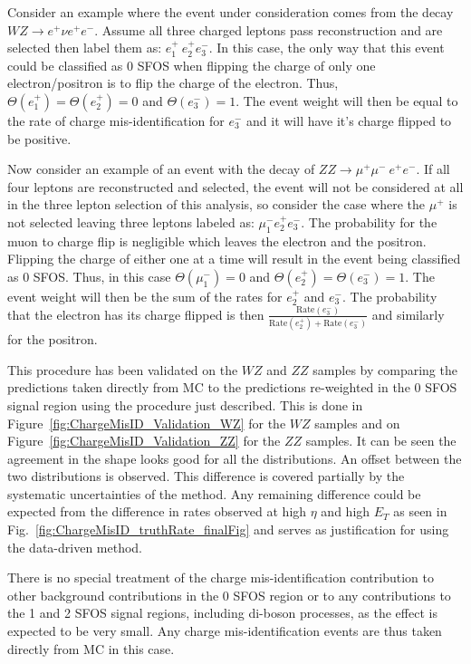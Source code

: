 Consider an example 
where the event under consideration comes from the decay $WZ\rightarrow e^{+}\nu e^{+}e^{-}$. Assume all three charged leptons pass reconstruction and are selected then label them as: $e^{+}_1~e^{+}_2e^{-}_3$. In this case,
the only way that this event could be classified as 0 SFOS when flipping the charge of only one electron/positron is to flip the charge of the electron.
Thus, $\Theta(e^{+}_1)=\Theta(e^{+}_2)=0$ and $\Theta(e^{-}_3)=1$.  The event weight will then be equal to the rate of charge mis-identification for  $e^{-}_3$ and it
will have it's charge flipped to be positive.

Now consider an example of an event with the decay of $ZZ\rightarrow \mu^{+}\mu^{-}~ e^{+}e^{-}$.
If all four leptons are reconstructed and selected, the event will not be considered at all in the three lepton selection of this analysis, so consider the 
case where the $\mu^{+}$ is not selected leaving three leptons labeled as: $\mu^{-}_1 e^{+}_2 e^{-}_3$.  The probability for the muon to charge flip
is negligible which leaves the electron and the positron. Flipping the charge of either one at a time will result in the event being classified as 0 SFOS.  Thus, in
this case $\Theta(\mu^{-}_1)=0$ and $\Theta(e^{+}_2)=\Theta(e^{-}_3)=1$. The event weight will then be the sum of the rates for $e^{+}_2$ and $e^{-}_3$.
The probability that the electron has its charge flipped is then $\frac{\textrm{Rate}(e^{-}_3) }{ \textrm{Rate}(e^{+}_2)+ \textrm{Rate}(e^{-}_3)}$ and similarly for the positron.

This procedure has been validated on the $WZ$ and $ZZ$ samples by comparing the predictions taken directly from MC to the predictions re-weighted in the 0 SFOS signal region using the procedure just described. This is done in Figure~\ref{fig:ChargeMisID_Validation_WZ} for the $WZ$ samples and on Figure~\ref{fig:ChargeMisID_Validation_ZZ} for the $ZZ$ samples. It can be seen the agreement in the shape looks good for all the distributions. An offset between the two distributions is observed. This difference is covered partially by the systematic uncertainties of the method.  Any remaining difference could be expected from the difference in rates observed at high $\eta$ and high $E_{T}$ as seen in Fig.~\ref{fig:ChargeMisID_truthRate_finalFig} and serves as justification for using the data-driven method.

There is no special treatment of the charge mis-identification contribution to other background contributions in the 0 SFOS region or to any contributions to the 
1 and 2 SFOS signal regions, including di-boson processes, as the effect is expected to be very small.  Any charge mis-identification events are thus taken directly 
from MC in this case.


